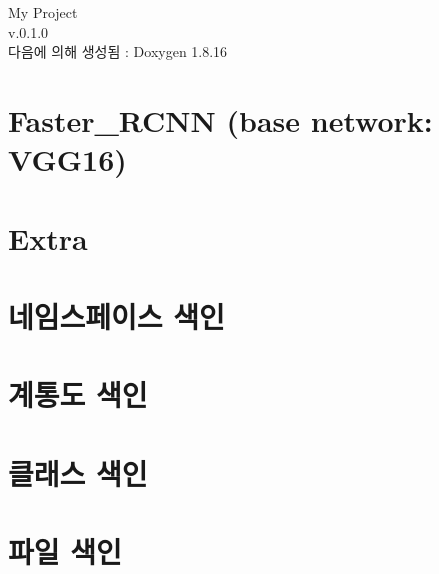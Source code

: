 \let\mypdfximage\pdfximage\def\pdfximage{\immediate\mypdfximage}\documentclass[twoside]{book}
\newcommand{\+}{\discretionary{\mbox{\scriptsize$\hookleftarrow$}}{}{}}
\newcommand{\clearemptydoublepage}{%
  \newpage{\pagestyle{empty}\cleardoublepage}%
}
\begin{document}
\hypersetup{pageanchor=false,
             bookmarksnumbered=true,
             pdfencoding=unicode
            }
\begin{titlepage}
\vspace*{7cm}
\begin{center}%
{\Large My Project \\[1ex]\large v.\+0.\+1.\+0 }\\
\vspace*{1cm}
{\large 다음에 의해 생성됨 \+:  Doxygen 1.8.16}\\
\end{center}
\end{titlepage}
\clearemptydoublepage
{}
\tableofcontents
\clearemptydoublepage
{}
\hypersetup{pageanchor=true}

\chapter{Faster\+\_\+\+R\+C\+NN (base network\+: V\+G\+G16)}
\label{index}\hypertarget{index}{}
\chapter{Extra}
\label{md_scripts_extra__r_e_a_d_m_e}

\chapter{네임스페이스 색인}

\chapter{계통도 색인}

\chapter{클래스 색인}

\chapter{파일 색인}

\end{document}

